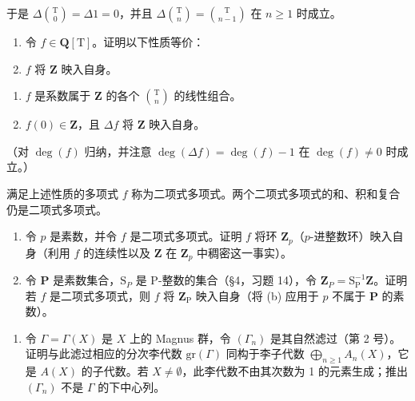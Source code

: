 于是 \(\Delta\binom{\mathrm{T}}{0} = \Delta 1 = 0\)，并且 \(\Delta\binom{\mathrm{T}}{n} = \binom{\mathrm{T}}{n - 1}\) 在 \(n \geqslant 1\) 时成立。

\begin{enumerate}
\def\labelenumi{(\alph{enumi})}
\item
  令 \(f \in \mathbf{Q}[\mathrm{T}]\)。证明以下性质等价：
\item
  \(f\) 将 \(\mathbf{Z}\) 映入自身。
\end{enumerate}

\begin{enumerate}
\def\labelenumi{(\roman{enumi})}
\setcounter{enumi}{1}
\item
  \(f\) 是系数属于 \(\mathbf{Z}\) 的各个 \(\binom{\mathrm{T}}{n}\) 的线性组合。
\item
  \(f(0)\in \mathbf{Z}\)，且 \(\Delta f\) 将 \(\mathbf{Z}\) 映入自身。
\end{enumerate}

（对 \(\deg(f)\) 归纳，并注意 \(\deg(\Delta f) = \deg(f) - 1\) 在 \(\deg(f) \neq 0\) 时成立。）

满足上述性质的多项式 \(f\) 称为二项式多项式。两个二项式多项式的和、积和复合仍是二项式多项式。

\begin{enumerate}
\def\labelenumi{(\alph{enumi})}
\setcounter{enumi}{1}
\item
  令 \(p\) 是素数，并令 \(f\) 是二项式多项式。证明 \(f\) 将环 \(\mathbf{Z}_p\)（\(p\)-进整数环）映入自身（利用 \(f\) 的连续性以及 \(\mathbf{Z}\) 在 \(\mathbf{Z}_p\) 中稠密这一事实）。
\item
  令 \(\mathbf{P}\) 是素数集合，\(\mathrm{S}_P\) 是 P-整数的集合（§4，习题 14），令 \(\mathbf{Z}_P = \mathrm{S}_{\mathrm{P}}^{-1}\mathbf{Z}\)。证明若 \(f\) 是二项式多项式，则 \(f\) 将 \(\mathbf{Z}_{\mathrm{P}}\) 映入自身（将 (b) 应用于 \(p\) 不属于 \(\mathbf{P}\) 的素数）。
\end{enumerate}

\begin{enumerate}
\def\labelenumi{\arabic{enumi}.}
\setcounter{enumi}{4}
\tightlist
\item
  令 \(\Gamma = \Gamma(X)\) 是 \(X\) 上的 Magnus 群，令 \((\Gamma_n)\) 是其自然滤过（第 2 号）。证明与此滤过相应的分次李代数 \(\mathrm{gr}(\Gamma)\) 同构于李子代数 \(\bigoplus_{n\geqslant 1}A_n(X)\)，它是 \(A(X)\) 的子代数。若 \(X\neq \emptyset\)，此李代数不由其次数为 1 的元素生成；推出 \((\Gamma_n)\) 不是 \(\Gamma\) 的下中心列。
\end{enumerate}

